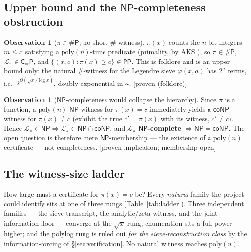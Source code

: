 \documentclass[11pt]{article}
\theoremstyle{plain}
\theoremstyle{definition}
\newtheorem{observation}[theorem]{Observation}
\theoremstyle{remark}
\newcommand{\stat}[1]{\quad\textnormal{\footnotesize\textsf{[\textcolor{accent}{#1}]}}}
\newcommand{\Lpi}{\mathcal{L}_{\pi}}
\newcommand{\NP}{\mathsf{NP}}
\newcommand{\coNP}{\mathsf{coNP}}
\newcommand{\sharpP}{\#\mathsf{P}}
\newcommand{\PP}{\mathsf{PP}}
\begin{document}
\subsection{Upper bound and the \texorpdfstring{$\NP$}{NP}-completeness obstruction}

\begin{observation}[$\pi\in\sharpP$; no short \#-witness]
\label{obs:sharpP}
$\pi(x)$ counts the $n$-bit integers $m\le x$ satisfying a $\mathrm{poly}(n)$-time
predicate (primality, by AKS \cite{aks2002}), so $\pi\in\sharpP$, $\Lpi\in\mathsf{C}_{=}\mathsf{P}$,
and $\{(x,c):\pi(x)\ge c\}\in\PP$. This is folklore and is an upper bound only:
the natural \#-witness for the Legendre sieve $\varphi(x,a)$ has $2^a$ terms, i.e.\
$2^{\Theta(\sqrt{x}/\log x)}$, doubly exponential in $n$.
\stat{proven (folklore)}
\end{observation}

\begin{observation}[$\NP$-completeness would collapse the hierarchy]
\label{obs:npcollapse}
Since $\pi$ is a function, a $\mathrm{poly}(n)$ $\NP$-witness for $\pi(x)=c$
immediately yields a $\coNP$-witness for $\pi(x)\ne c$ (exhibit the true
$c'=\pi(x)$ with its witness, $c'\ne c$). Hence
$\Lpi\in\NP\Rightarrow\Lpi\in\NP\cap\coNP$, and \textbf{$\Lpi$ $\NP$-complete
$\Rightarrow\NP=\coNP$.} The open question is therefore mere $\NP$-membership ---
the existence of a $\mathrm{poly}(n)$ certificate --- not completeness.
\stat{proven implication; membership open}
\end{observation}

\subsection{The witness-size ladder}

How large must a certificate for $\pi(x)=c$ be? Every \emph{natural} family the
project could identify sits at one of three rungs (Table~\ref{tab:ladder}). Three
independent families --- the sieve transcript, the analytic/zeta witness, and the
joint-information floor --- converge at the $\sqrt{x}$ rung; enumeration sits a
full power higher; and the polylog rung is ruled out \emph{for the
sieve-reconstruction class} by the information-forcing of \S\ref{sec:verification}.
No natural witness reaches $\mathrm{poly}(n)$.
\end{document}
